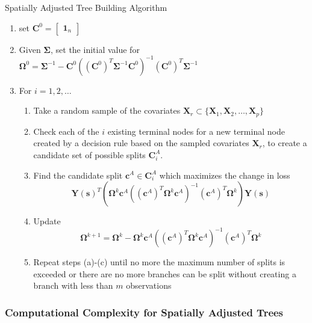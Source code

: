 \documentclass[12pt]{article}
\newcommand{\proc}{\mathbf{Y}(\mathbf{s})}
\newcommand{\covs}{\mathbf{X}}
\newcommand{\Sig}{\boldsymbol{\Sigma}}
\newcommand{\Om}{\boldsymbol{\Omega}}
\newcommand{\ca}{\mathbf{c}^A}
\newcommand{\cat}{ \left(\mathbf{c}^A\right)^T}
\newcommand{\candset}{\mathbf{C}^A_i}
\begin{document}
\begin{algorithm}
	\label{spatTree}
	\caption{Spatially Adjusted Tree Building Algorithm}
	\begin{enumerate}
		\item set $\mathbf{C}^0 = \begin{bmatrix} \mathbf{1}_n \end{bmatrix}$
		\item Given $\Sig$, set the initial value for $\Om^0= \Sig^{-1} - \mathbf{C}^0 \left((\mathbf{C}^0)^T \Sig^{-1} \mathbf{C}^0\right)^{-1} (\mathbf{C}^0)^T \Sig^{-1} $
		\item For $i = 1, 2, \ldots$
		\begin{enumerate}
			\item Take a random sample of the covariates $\covs_r \subset \{\covs_1, \covs_2, \ldots, \covs_p\}$
			\item Check each of the $i$ existing terminal nodes for a new terminal node created by a decision rule based on the sampled covariates $\covs_r$, to create a candidate set of possible splits $\candset$.
			\item Find the candidate split $\ca \in \candset$ which maximizes the change in loss 
			$$\proc^T \left(\Om^k \ca \left( \cat \Om^k \ca \right)^{-1} \cat \Om^k \right)\proc$$
			\item Update $$\Om^{k+1} = \Om^k - \Om^k \ca \left(\cat \Om^k \ca \right)^{-1} \cat \Om^k $$
			\item Repeat steps (a)-(c) until no more the maximum number of splits is exceeded or there are no more branches can be split without creating a branch with less than $m$ observations
		\end{enumerate}
	\end{enumerate}
\end{algorithm} 

\subsubsection{Computational Complexity for Spatially Adjusted Trees}
\label{compcmplx}
\end{document}

